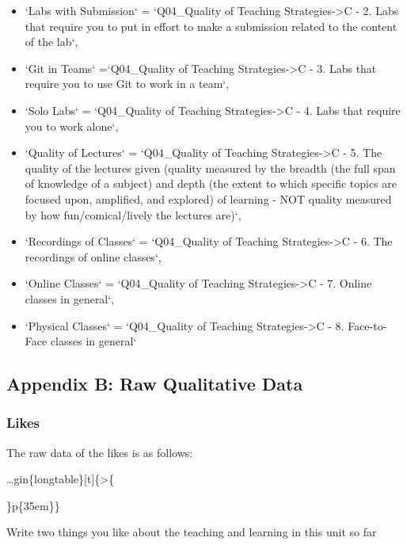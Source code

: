 \documentclass[
]{article}
\begin{document}
\begin{itemize}
\item
  `Labs with Submission` = `Q04\_Quality of Teaching
  Strategies-\textgreater C - 2. Labs that require you to put in effort
  to make a submission related to the content of the lab`,
\item
  `Git in Teams` =`Q04\_Quality of Teaching Strategies-\textgreater C -
  3. Labs that require you to use Git to work in a team`,
\item
  `Solo Labs` = `Q04\_Quality of Teaching Strategies-\textgreater C - 4.
  Labs that require you to work alone`,
\item
  `Quality of Lectures` = `Q04\_Quality of Teaching
  Strategies-\textgreater C - 5. The quality of the lectures given
  (quality measured by the breadth (the full span of knowledge of a
  subject) and depth (the extent to which specific topics are focused
  upon, amplified, and explored) of learning - NOT quality measured by
  how fun/comical/lively the lectures are)`,
\item
  `Recordings of Classes` = `Q04\_Quality of Teaching
  Strategies-\textgreater C - 6. The recordings of online classes`,
\item
  `Online Classes` = `Q04\_Quality of Teaching Strategies-\textgreater C
  - 7. Online classes in general`,
\item
  `Physical Classes` = `Q04\_Quality of Teaching
  Strategies-\textgreater C - 8. Face-to-Face classes in general`
\end{itemize}

\subsection{Appendix B: Raw Qualitative
Data}\label{appendix-b-raw-qualitative-data}

\subsubsection{Likes}\label{likes}

The raw data of the likes is as follows:

\ldots gin\{longtable\}{[}t{]}\{\textgreater\{

\raggedright

\arraybackslash\}p\{35em\}\}

\caption{\label{tab:RawLikesData}Write two things you like about the teaching and learning in this unit so far}
\end{document}
